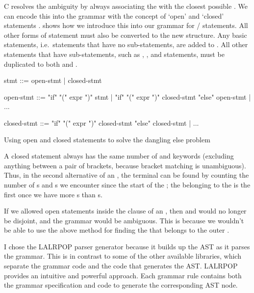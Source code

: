 \documentclass[00-main.tex]{subfiles}
\begin{document}
C resolves the ambiguity by always associating the  with the closest possible .
We can encode this into the grammar with the concept of `open' and `closed' statements .
 shows how we introduce this into our grammar for / statements.
All other forms of statement must also be converted to the new structure.
Any basic statements, i.e.\ statements that have no sub-statements, are added to .
All other statements that have sub-statements, such as , , and  statements, must be duplicated to both  and .


\begin{listing}[!ht]
  \begin{GrammarListing}
    stmt        ::= open-stmt | closed-stmt

    open-stmt   ::= "if" "(" expr ")" stmt
                  | "if" "(" expr ")" closed-stmt "else" open-stmt
                  | ...

    closed-stmt ::= "if" "(" expr ")" closed-stmt "else" closed-stmt
                  | ...
  \end{GrammarListing}
  \caption{Using open and closed statements to solve the dangling else problem}
  \label{lst:open/closed statement grammar}
\end{listing}

A closed statement always has the same number of  and  keywords (excluding anything between a pair of brackets, because bracket matching is unambiguous).
Thus, in the second alternative of an , the  terminal can be found by counting the number of s and s we encounter since the start of the ; the  belonging to the  is the first  once we have more s than s.

If we allowed open statements inside the  clause of an , then  and  would no longer be disjoint, and the grammar would be ambiguous. This is because we wouldn't be able to use the above method for finding the  that belongs to the outer .

I chose the LALRPOP parser generator because it builds up the AST as it parses the grammar.
This is in contrast to some of the other available libraries, which separate the grammar code and the code that generates the AST\@.
LALRPOP provides an intuitive and powerful approach.
Each grammar rule contains both the grammar specification and code to generate the corresponding AST node.
\end{document}

